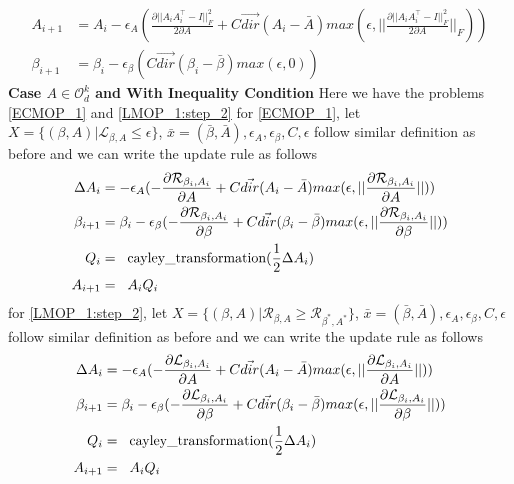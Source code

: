\begin{equation}
\begin{aligned}
A_{i+1} &= A_{i} - \epsilon_A ( \frac{\partial || A_iA^\top_i -I||^2_F}{2\partial A} + C \vec{dir}(A_i-\bar{A}) max(\epsilon,||\frac{\partial || A_iA^\top_i -I||^2_F}{2\partial A}||_F))\\
\beta_{i+1} &= \beta_{i} - \epsilon_{\beta} ( C \vec{dir}(\beta_i-\bar{\beta}) max(\epsilon,0))
\end{aligned}    
\end{equation}
\newline \textbf{Case $A \in \mathcal{O}_d^k$ and With Inequality Condition}
\newline Here we have the problems \ref{ECMOP_1} and \ref{LMOP_1:step_2} 
\newline for \ref{ECMOP_1}, let $X = \{(\beta, A) |  \mathcal{L}_{\beta, A} \le \epsilon \}$, $\bar{x} = (\bar{\beta},\bar{A}), \epsilon_A, \epsilon_{\beta}, C, \epsilon$ follow similar definition as before and we can write the update rule as follows
\begin{equation}
\begin{aligned}
\Delta A_{i} &= - \epsilon_A ( -\frac{\partial \mathcal{R}_{\beta_i, A_i}}{\partial A} + C \vec{dir}(A_i-\bar{A}) max(\epsilon,||\frac{\partial \mathcal{R}_{\beta_i, A_i}}{\partial A}||))\\
\beta_{i+1} &= \beta_{i} - \epsilon_{\beta} ( -\frac{\partial \mathcal{R}_{\beta_i, A_i}}{\partial \beta} + C \vec{dir}(\beta_i-\bar{\beta}) max(\epsilon,||\frac{\partial \mathcal{R}_{\beta_i, A_i}}{\partial \beta}||))\\
Q_i &= \hspace{2mm} \text{cayley\_transformation}(\frac{1}{2} \Delta A_i)\\
A_{i+1} &= \hspace{2mm} A_i Q_i \\
\end{aligned}    
\end{equation}
\newline for \ref{LMOP_1:step_2}, let $X = \{(\beta, A) | \mathcal{R}_{\beta, A} \ge \mathcal{R}_{\beta^{*}, A^{*}}\}$, $\bar{x} = (\bar{\beta},\bar{A}), \epsilon_A, \epsilon_{\beta}, C, \epsilon$ follow similar definition as before and we can write the update rule as follows
\begin{equation}
\begin{aligned}
\Delta A_{i} &= - \epsilon_A ( -\frac{\partial \mathcal{L}_{\beta_i, A_i}}{\partial A} + C \vec{dir}(A_i-\bar{A}) max(\epsilon,||\frac{\partial \mathcal{L}_{\beta_i, A_i}}{\partial A}||))\\
\beta_{i+1} &= \beta_{i} - \epsilon_{\beta} ( -\frac{\partial \mathcal{L}_{\beta_i, A_i}}{\partial \beta} + C \vec{dir}(\beta_i-\bar{\beta}) max(\epsilon,||\frac{\partial \mathcal{L}_{\beta_i, A_i}}{\partial \beta}||))\\
Q_i &= \hspace{2mm} \text{cayley\_transformation}(\frac{1}{2} \Delta A_i)\\
A_{i+1} &= \hspace{2mm} A_i Q_i \\
\end{aligned}    
\end{equation}
